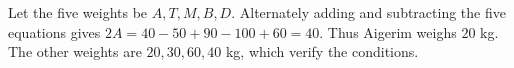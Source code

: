 Let the five weights be $A,T,M,B,D$. Alternately adding and subtracting the five equations gives $2A=40-50+90-100+60=40$. Thus Aigerim weighs $\boxed{20}$ kg. The other weights are $20,30,60,40$ kg, which verify the conditions.
